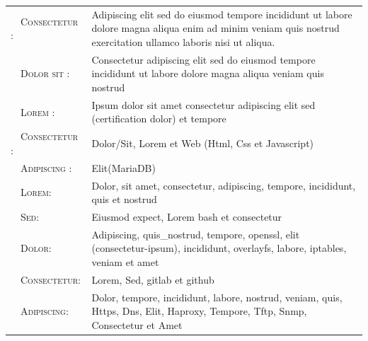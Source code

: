 %
%
%

\renewcommand{\arraystretch}{1.1}

\begin{tabular}{>{}l>{}p{13cm}} 
	\textsc{\faFontAwesome \ \ Consectetur :}	&  Adipiscing elit sed do eiusmod tempore incididunt ut labore dolore magna aliqua enim ad minim veniam quis nostrud exercitation ullamco laboris nisi ut aliqua.
	\vspace{0.2cm}\\
	\textsc{\faPlane \ \ Dolor sit :}	 &
	Consectetur adipiscing elit sed do eiusmod tempore incididunt ut labore dolore magna aliqua veniam quis nostrud 
	\vspace{0.2cm}\\
	\textsc{\faBug  \ \ Lorem :}	 & 
	Ipsum dolor sit amet consectetur adipiscing elit sed (certification dolor) et tempore 
	\vspace{0.2cm}\\
	\textsc{\faCode \ \ Consectetur :}	& 
	Dolor/Sit, Lorem et Web (Html, Css et Javascript)  
	\vspace{0.2cm}\\
	\textsc{\faDatabase \ \ Adipiscing :}	& 
	Elit(MariaDB)  
	\vspace{0.2cm}\\
	\textsc{\faCodeFork  \ \ Lorem:}	& Dolor, sit amet, consectetur, adipiscing, tempore, incididunt, quis et nostrud  
	\vspace{0.2cm}\\	
	\textsc{\faLinux  \ \ Sed:}	& Eiusmod expect, Lorem bash et consectetur  
	\vspace{0.2cm}\\
	\textsc{\faKey \ \ Dolor:}	& Adipiscing, quis\_nostrud, tempore, openssl, elit (consectetur-ipsum), incididunt, overlayfs, labore, iptables, veniam et amet 
	\vspace{0.2cm}\\	
	\textsc{\faGitAlt \ \ Consectetur:}	& Lorem, Sed, gitlab et github
	\vspace{0.2cm}\\
	\textsc{\faNetworkWired \ \ Adipiscing:}	& Dolor, tempore, incididunt, labore, nostrud, veniam, quis, Https, Dns, Elit, Haproxy, Tempore, Tftp, Snmp, Consectetur et Amet
	\vspace{0.2cm}\\

\end{tabular}
